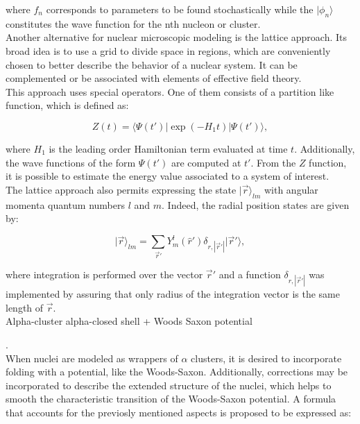 \documentclass[openany]{book}
\begin{document}
where $f_n$ corresponds to parameters to be found stochastically while the $|\phi_n \rangle$ constitutes the wave function for the nth nucleon or cluster. \\ 
	
Another alternative for nuclear microscopic modeling is the lattice approach. Its broad idea is to use a grid to divide space in regions, which are conveniently chosen to better describe the behavior of a nuclear system. It can be complemented or be associated with elements of effective field theory. \\

This approach uses special operators. One of them consists of a partition like function, which is defined as: 

\begin{equation}\label{eq:micro_lattice_Z}
	Z(t) = \langle \Psi(t') | \exp {(-H_1 t)}|   \Psi(t') \rangle, 
\end{equation}

where $H_1$ is the leading order Hamiltonian term evaluated at time $t$. Additionally, the wave functions of the form $\Psi(t')$ are computed at $t'$. From the $Z$ function, it is possible to estimate the energy value associated to a system of interest. \\

The lattice approach also permits expressing the state $	| \vec r \rangle_{lm}$ with angular momenta quantum numbers $l$ and $m$.  Indeed, the radial position states are given by:

\begin{equation}\label{eq:micro_lattice_vector}
	| \vec r \rangle_{lm} = \sum_{\vec r'} { Y^{l}_{m} (\hat r') \delta_{r, |\vec r'|} |\vec r' \rangle},
\end{equation}

where integration is performed over the vector $\vec r'$ and a function $\delta_{r, |\vec r'|}$ was implemented by assuring that only radius of the integration vector is the same length of $\vec r$. \\

Alpha-cluster alpha-closed shell + Woods Saxon potential  

\cite{bai_ren_2018}. \\

When nuclei are modeled as wrappers of $\alpha$ clusters, it is desired to incorporate folding with a potential, like the Woods-Saxon. Additionally, corrections may be incorporated to describe the extended structure of the nuclei, which helps to smooth the characteristic transition of the Woods-Saxon potential. A formula that accounts for the previosly mentioned aspects is proposed to be expressed as: 
\end{document}
